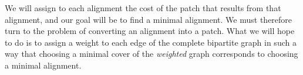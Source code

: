 \documentclass{article}
\begin{document}

We will assign to each alignment the cost of the patch that results from
that alignment, and our goal will be to find a minimal alignment. We must
therefore turn to the problem of converting an alignment into a patch. What
we will hope to do is to assign a weight to each edge of the complete
bipartite graph in such a way that choosing a minimal cover of the
\emph{weighted} graph corresponds to choosing a minimal alignment.
\end{document}
